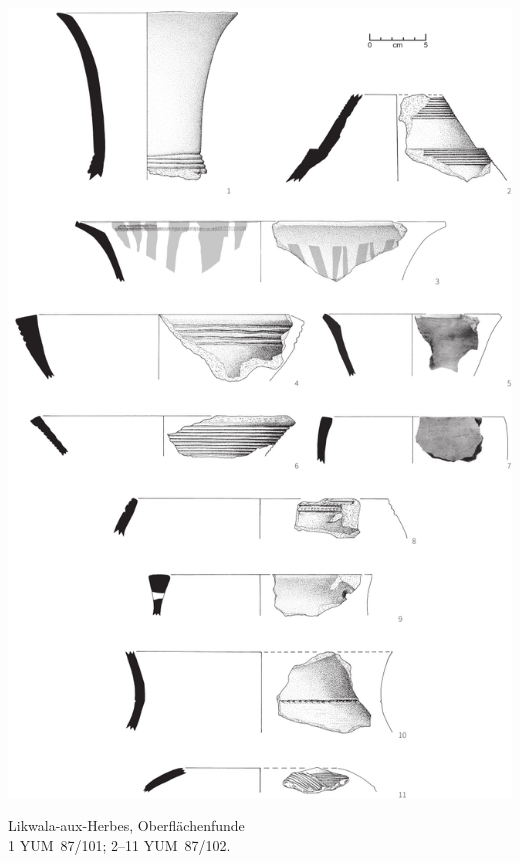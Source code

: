 \begin{pl}[H]
	\includegraphics{plt/Taf73.pdf}
	\vspace{.75em}\caption{Likwala-aux-Herbes, Oberflächenfunde \\ 1 YUM~87/101; 2--11 YUM~87/102.}
	\label{pl:73}
\end{pl}

